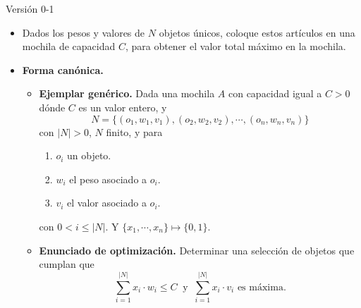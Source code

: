 \begin{frame}{Versión 0-1}
     \begin{itemize}[<+->]
     \item Dados los pesos y valores de $N$ objetos únicos, coloque estos artículos
       en una mochila de capacidad $C$, para obtener el valor total máximo en la mochila.
       
     \item \textbf{Forma canónica.}
       \begin{itemize}[<+->]
       \item \textbf{Ejemplar genérico.} Dada una mochila $A$ con capacidad igual a $C > 0$
         dónde $C$ es un valor entero, y
         \[N = \{(o_1, w_1, v_1), (o_2, w_2, v_2), \dotsm, (o_n, w_n, v_n)\}\]
         con $|N| > 0$, $N$ finito,  y para
         \begin{enumerate}
         \item $o_i$ un objeto. 
         \item $w_i$ el peso asociado a $o_i$.
         \item $v_i$ el valor asociado a $o_i$.
         \end{enumerate}
         con $0 < i \leq |N|$. Y $\{x_1, \dotsm, x_n\} \mapsto \{0, 1\}$.
       \item \textbf{Enunciado de optimización.} Determinar una selección de objetos que cumplan que
         \[\sum_{i=1}^{|N|} x_i \cdot w_i \leq C\ \text{  y  }\ \sum_{i=1}^{|N|} x_i \cdot v_i \text{ es máxima.}\]
       \end{itemize}
     \end{itemize}
\end{frame}

